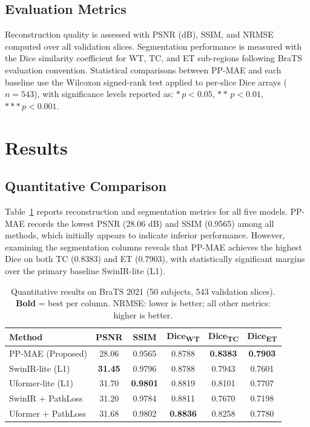 \documentclass[conference]{IEEEtran}
\begin{document}
\subsection{Evaluation Metrics}

Reconstruction quality is assessed with PSNR (dB), SSIM, and NRMSE
computed over all validation slices. Segmentation performance is
measured with the Dice similarity coefficient for WT, TC, and ET
sub-regions following BraTS evaluation convention. Statistical
comparisons between PP-MAE and each baseline use the Wilcoxon
signed-rank test applied to per-slice Dice arrays ($n=543$),
with significance levels reported as:
$* \, p < 0.05$, $** \, p < 0.01$, $*** \, p < 0.001$.

\section{Results}

\subsection{Quantitative Comparison}

Table~\ref{tab:main_results} reports reconstruction and segmentation
metrics for all five models. PP-MAE records the lowest PSNR
(28.06 dB) and SSIM (0.9565) among all methods, which initially
appears to indicate inferior performance. However, examining the
segmentation columns reveals that PP-MAE achieves the highest Dice
on both TC ($0.8383$) and ET ($0.7903$), with statistically
significant margins over the primary baseline SwinIR-lite (L1).

\begin{table}[t]
  \caption{Quantitative results on BraTS 2021 (50 subjects, 543
    validation slices). \textbf{Bold} = best per column.
    NRMSE: lower is better; all other metrics: higher is better.}
  \label{tab:main_results}
  \centering
  \renewcommand{\arraystretch}{1.2}
  \begin{tabular}{lccccc}
    \toprule
    \textbf{Method} & \textbf{PSNR} & \textbf{SSIM}
      & \textbf{Dice\textsubscript{WT}}
      & \textbf{Dice\textsubscript{TC}}
      & \textbf{Dice\textsubscript{ET}} \\
    \midrule
    PP-MAE (Proposed) & 28.06 & 0.9565
      & 0.8788 & \textbf{0.8383} & \textbf{0.7903} \\
    SwinIR-lite (L1) & \textbf{31.45} & 0.9796
      & 0.8788 & 0.7943 & 0.7601 \\
    Uformer-lite (L1) & 31.70 & \textbf{0.9801}
      & 0.8819 & 0.8101 & 0.7707 \\
    SwinIR + PathLoss & 31.20 & 0.9784
      & 0.8811 & 0.7670 & 0.7198 \\
    Uformer + PathLoss & 31.68 & 0.9802
      & \textbf{0.8836} & 0.8258 & 0.7780 \\
    \bottomrule
  \end{tabular}
\end{table}
\end{document}
